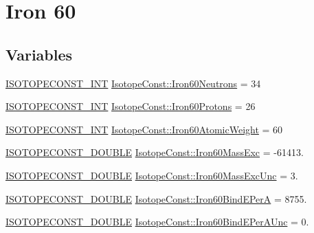 \hypertarget{group___isotope_const-_iron-_fe60}{}\section{Iron 60}
\label{group___isotope_const-_iron-_fe60}
\subsection*{Variables}
\begin{DoxyCompactItemize}
\item 
\mbox{\hyperlink{group___isotope_const-_macros_ga5f18360b3e99483a35c32d789e62621c}{I\+S\+O\+T\+O\+P\+E\+C\+O\+N\+S\+T\+\_\+\+I\+NT}} \mbox{\hyperlink{group___isotope_const-_iron-_fe60_ga2a0183288f77a48ea72f6b10fd9e787b}{Isotope\+Const\+::\+Iron60\+Neutrons}} = 34
\item 
\mbox{\hyperlink{group___isotope_const-_macros_ga5f18360b3e99483a35c32d789e62621c}{I\+S\+O\+T\+O\+P\+E\+C\+O\+N\+S\+T\+\_\+\+I\+NT}} \mbox{\hyperlink{group___isotope_const-_iron-_fe60_ga850123454c3847cbe199ed0eb415cc77}{Isotope\+Const\+::\+Iron60\+Protons}} = 26
\item 
\mbox{\hyperlink{group___isotope_const-_macros_ga5f18360b3e99483a35c32d789e62621c}{I\+S\+O\+T\+O\+P\+E\+C\+O\+N\+S\+T\+\_\+\+I\+NT}} \mbox{\hyperlink{group___isotope_const-_iron-_fe60_gae3d205b553bddd5427b2d316ccc9369f}{Isotope\+Const\+::\+Iron60\+Atomic\+Weight}} = 60
\item 
\mbox{\hyperlink{group___isotope_const-_macros_ga8f45a7272ce02c0b4c65c44636ed719a}{I\+S\+O\+T\+O\+P\+E\+C\+O\+N\+S\+T\+\_\+\+D\+O\+U\+B\+LE}} \mbox{\hyperlink{group___isotope_const-_iron-_fe60_ga1f3e18ae956ecaa2db783e904ec6f817}{Isotope\+Const\+::\+Iron60\+Mass\+Exc}} = -\/61413.
\item 
\mbox{\hyperlink{group___isotope_const-_macros_ga8f45a7272ce02c0b4c65c44636ed719a}{I\+S\+O\+T\+O\+P\+E\+C\+O\+N\+S\+T\+\_\+\+D\+O\+U\+B\+LE}} \mbox{\hyperlink{group___isotope_const-_iron-_fe60_ga15de2f8bb34888ef6bd9adc5d5ceb8f5}{Isotope\+Const\+::\+Iron60\+Mass\+Exc\+Unc}} = 3.
\item 
\mbox{\hyperlink{group___isotope_const-_macros_ga8f45a7272ce02c0b4c65c44636ed719a}{I\+S\+O\+T\+O\+P\+E\+C\+O\+N\+S\+T\+\_\+\+D\+O\+U\+B\+LE}} \mbox{\hyperlink{group___isotope_const-_iron-_fe60_gade65210bca4192d9da13d871354cbacd}{Isotope\+Const\+::\+Iron60\+Bind\+E\+PerA}} = 8755.
\item 
\mbox{\hyperlink{group___isotope_const-_macros_ga8f45a7272ce02c0b4c65c44636ed719a}{I\+S\+O\+T\+O\+P\+E\+C\+O\+N\+S\+T\+\_\+\+D\+O\+U\+B\+LE}} \mbox{\hyperlink{group___isotope_const-_iron-_fe60_ga11c87494b8800a05655619738a4c77c1}{Isotope\+Const\+::\+Iron60\+Bind\+E\+Per\+A\+Unc}} = 0.

\end{DoxyCompactItemize}
